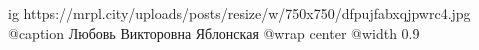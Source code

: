  
 
 
 
 

\ifcmt
  ig https://mrpl.city/uploads/posts/resize/w/750x750/dfpujfabxqjpwrc4.jpg
	@caption Любовь Викторовна Яблонская
  @wrap center
  @width 0.9
\fi
